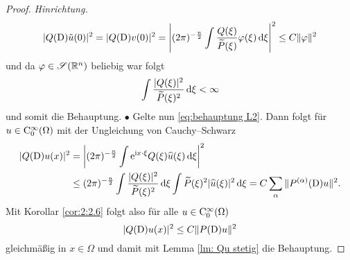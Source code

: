 \begin{proof}{\it Hinrichtung.}
\begin{equation}
|Q(\mathrm D)\tilde{u}(0)|^2 = |Q(\mathrm D)v(0)|^2 = \left|(2 \pi)^{-\frac{n}{2}} \int \frac{Q(\xi)}{\widetilde{P}(\xi)} \varphi(\xi) \,\mathrm d \xi \right|^2 \leq {C} \Vert \varphi \Vert^2
\end{equation}
und da $\varphi\in\mathscr S(\mathbb R^n)$ beliebig war folgt
\begin{equation}\label{eq:behauptung L2}
\int \frac{|Q(\xi)|^2}{\widetilde{P}(\xi)^2} \,\mathrm d \xi < \infty
\end{equation}
und somit die Behauptung. $\bullet$
Gelte nun \eqref{eq:behauptung L2}. Dann folgt für $u \in \mathrm C_0^{\infty}(\Omega)$ mit der Ungleichung von Cauchy--Schwarz
\begin{align}
|Q(\mathrm D)u(x)|^2 &=  \left|(2 \pi)^{-\frac{n}{2}} \int \mathrm e^{\mathrm i x \cdot \xi} Q(\xi) \widehat{u}(\xi)  \,\mathrm d \xi \right|^2 \notag
\\ & \leq (2 \pi)^{-\frac{n}{2}} \int \frac{|Q(\xi)|^2}{\widetilde{P}(\xi)^2} \,\mathrm d \xi \int \widetilde{P}(\xi)^2 | \widehat{u}(\xi)|^2 \,\mathrm d \xi = C \sum_{\alpha} \Vert P^{(\alpha)}(\mathrm D)u\Vert^2.
\end{align}
Mit Korollar \ref{cor:2:2.6} folgt also für alle $u \in \mathrm C_0^{\infty}(\Omega)$
\begin{equation}
|Q(\mathrm D)u(x)|^2 \leq C \Vert P(\mathrm D)u\Vert^2
\end{equation}
gleichmäßig in $x\in\Omega$ und damit mit Lemma \ref{lm: Qu stetig} die Behauptung.
\end{proof}

